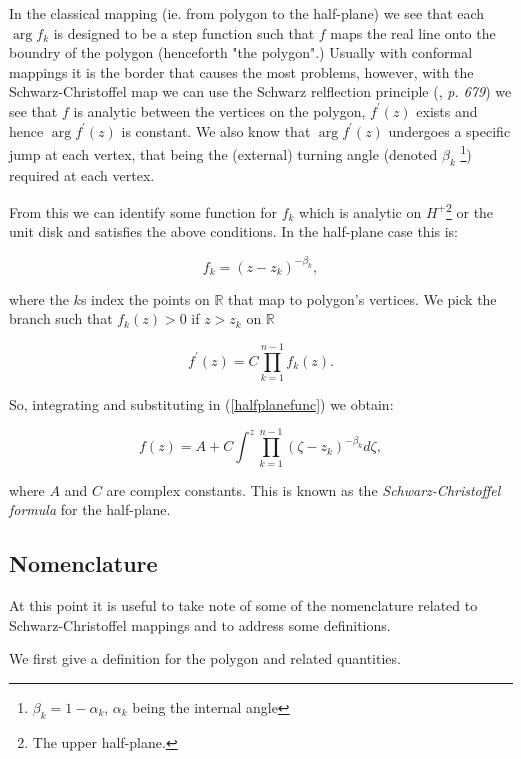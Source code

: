 \documentclass[a4paper,10pt]{amsart}
\newcommand{\sch}{Schwarz-Christoffel }
\newcommand{\fprime}{f^\prime(z)}
\begin{document}
In the classical mapping (ie. from polygon to the half-plane) we see that each $\arg f_k$ is designed to be a step function such that $f$ maps the real line onto the boundry of the polygon (henceforth "the polygon".) Usually with conformal mappings it is the border that causes the most problems, however, with the \sch map we can use the Schwarz relflection principle (\cite{handbuch}, \emph{p. 679}) we see that $f$ is analytic between the vertices on the polygon, $\fprime$ exists and hence $\arg \fprime$ is constant. We also know that $\arg \fprime$ undergoes a specific jump at each vertex, that being the (external) turning angle (denoted $\beta_k$ \footnote{$\beta_k = 1-\alpha_k$, $\alpha_k$ being the internal angle}) required at each vertex. 

From this we can identify some function for $f_k$ which is analytic on $H^+$\footnote{The upper half-plane.} or the unit disk and satisfies the above conditions. In the half-plane case this is:

\begin{equation}
\label{halfplanefunc}
f_k = (z-z_k)^{-\beta_k},
\end{equation}

where the $k$s index the points on $\mathbb{R}$ that map to polygon's vertices. We pick the branch such that $f_k(z)>0$ if $z>z_k$ on $\mathbb{R}$

\begin{equation}
\fprime = C \prod_{k=1}^{n-1} f_k(z).
\end{equation}

So, integrating and substituting in (\ref{halfplanefunc}) we obtain:

\begin{equation}
f(z) = A + C \int^z \prod_{k=1}^{n-1} (\zeta-z_k)^{-\beta_k} d\zeta,
\end{equation}

where $A$ and $C$ are complex constants. This is known as the \emph{\sch formula} for the half-plane.


\subsection{Nomenclature}

At this point it is useful to take note of some of the nomenclature related to \sch mappings and to address some definitions.

We first give a definition for the polygon and related quantities.
\end{document}
